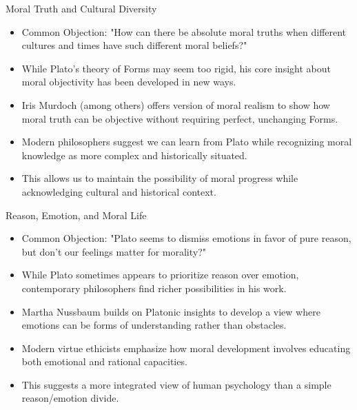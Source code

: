 \documentclass[aspectratio=169]{beamer}
\begin{document}
\begin{frame}{Moral Truth and Cultural Diversity}
\begin{itemize}
    \item Common Objection: "How can there be absolute moral truths when different cultures and times have such different moral beliefs?"
    \item While Plato's theory of Forms may seem too rigid, his core insight about moral objectivity has been developed in new ways.
    \item Iris Murdoch (among others) offers version of moral realism to show how moral truth can be objective without requiring perfect, unchanging Forms.
    \item Modern philosophers suggest we can learn from Plato while recognizing moral knowledge as more complex and historically situated.
    \item This allows us to maintain the possibility of moral progress while acknowledging cultural and historical context.
    \end{itemize}
\end{frame}

\begin{frame}{Reason, Emotion, and Moral Life}
    \begin{itemize}
    \item Common Objection: "Plato seems to dismiss emotions in favor of pure reason, but don't our feelings matter for morality?"
    \item While Plato sometimes appears to prioritize reason over emotion, contemporary philosophers find richer possibilities in his work.
    \item Martha Nussbaum builds on Platonic insights to develop a view where emotions can be forms of understanding rather than obstacles.
    \item Modern virtue ethicists emphasize how moral development involves educating both emotional and rational capacities.
    \item This suggests a more integrated view of human psychology than a simple reason/emotion divide.
    \end{itemize}
\end{frame}
\end{document}
